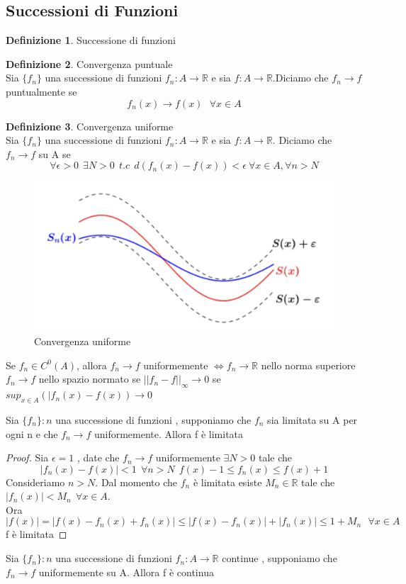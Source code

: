 \documentclass{article}
\theoremstyle{definition}
\newtheorem*{definizione}{Definizione}
\newcommand{\R}{\mathbb{R}}
\begin{document}
\subsection{Successioni di Funzioni}
\begin{definizione}
Successione di funzioni 
\end{definizione}
\begin{definizione}
Convergenza puntuale\\
Sia $\{f_n\}$ una successione di funzioni $f_n:A \rightarrow \R$  e sia $f:A\rightarrow \R$.Diciamo che $f_n\rightarrow f$ puntualmente se $$f_n(x)\rightarrow f(x) \ \ \ \forall x \in A$$
\end{definizione}
\begin{definizione}
Convergenza uniforme\\
Sia $\{f_n\}$ una successione di funzioni $f_n:A\rightarrow\R$ e sia $f:A\rightarrow \R$. Diciamo che $f_n\rightarrow f$ su A se 
$$\forall \epsilon > 0 \ \ \exists N>0\ \ t.c \ \ d(f_n(x)-f(x))<\epsilon \ \forall x \in A , \forall n > N$$
\begin{figure}[h]
\centering
\includegraphics[scale=0.30]{immagini/uniforme}
\caption{Convergenza uniforme }
\end{figure}
\end{definizione}
Se $f_n \in C^0(A)$, allora $f_n \rightarrow f$ uniformemente $\iff f_n\rightarrow \R$ nello norma superiore  \\
$f_n\rightarrow f$ nello spazio normato se $||f_n-f||_{\infty}\rightarrow 0 $ se $sup_{x\in A}(|f_n(x)-f(x))\rightarrow 0$
\begin{teo*}{}
Sia $\{f_n\}:n$ una successione di funzioni , supponiamo che $f_n$ sia limitata su A per ogni n e che $f_n\rightarrow f$ uniformemente. Allora f è limitata 
\end{teo*}
\begin{proof}
	Sia $\epsilon=1$ , date che $f_n\rightarrow f$ uniformemente $\exists N >0 $ tale che $$|f_n(x)-f(x)|<1 \ \ \forall n > N \ \ f(x)-1 \leq f_n(x)\leq f(x)+1$$
	Consideriamo $n>N$. Dal momento che $f_n$ è limitata esiste $M_n\in \R $ tale che $|f_n(x)|<M_n \ \ \forall x \in A$.\\
	Ora $$|f(x)|=|f(x)-f_n(x)+f_n(x)|\leq |f(x)-f_n(x)|+|f_n(x)|\leq 1+M_n \ \ \ \forall x\in A$$
	f è limitata 	
\end{proof}
\begin{teo}{}{}
Sia $\{f_n\}:n$ una successione di funzioni $f_n: A \rightarrow\R$ continue , supponiamo che $f_n\rightarrow f$ uniformemente su A. Allora f è continua 
\end{teo}
\end{document}
